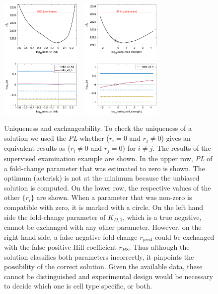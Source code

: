 \documentclass{bioinfo}
\begin{document}
\begin{figure}[!tpb]%
\centerline{\includegraphics[width=110pt]{Figures/uniqueness_1.pdf}~~\includegraphics[width=110pt]{Figures/uniqueness.pdf}}
\caption{Uniqueness and exchangeability. To check the uniqueness of a solution we used the \emph{PL} whether ($r_i=0$ and $r_j\neq0$) gives an equivalent results as ($r_i\neq0$ and $r_j=0$) for $i\neq j$. The results of the supervised examination example are shown. In the upper row, \emph{PL} of a fold-change parameter that was estimated to zero is shown. The optimum (asterisk) is not at the minimum because the unbiased solution is computed. On the lower row, the respective values of the other $\{r_i\}$ are shown. When a parameter that was non-zero is compatible with zero, it is marked with a circle. On the left hand side the fold-change parameter of $K_{D,1}$, which is a true negative, cannot be exchanged with any other parameter. However, on the right hand side, a false negative fold-change $r_{pro4}$ could be exchanged with the false positive Hill coefficient $r_{H8}$. Thus although the solution classifies both parameters incorrectly, it pinpoints the possibility of the correct solution. Given the available data, these cannot be distinguished and experimental design would be necessary to decide which one is cell type specific, or both.}\label{fig:07}
\end{figure}
\end{document}
